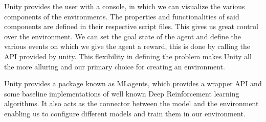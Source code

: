 Unity provides the user with a console, in which we can visualize the various components of the environments. The properties and functionalities of said components are defined in their respective script files. This gives us great control over the environment. We can set the goal state of the agent and define the various events on which we give the agent a reward, this is done by calling the API provided by unity. This flexibility in defining the problem makes Unity all the more alluring and our primary choice for creating an environment.

Unity provides a package known as MLagents, which provides a wrapper API and some baseline implementations of well known Deep Reinforcement learning algorithms. It also acts as the connector between the model and the environment enabling us to configure different models and train them in our environment.

